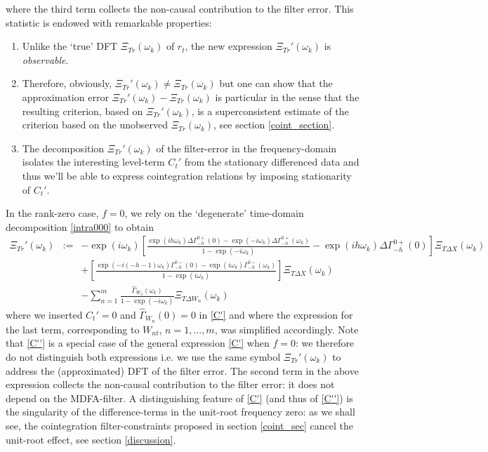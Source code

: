 \documentclass[11pt]{article}
\begin{document}
where the third term collects the non-causal contribution to the filter error. This statistic is endowed with remarkable properties:
\begin{enumerate}
\item Unlike the `true' DFT $\Xi_{Tr}(\omega_k)$ of $r_t$, the new expression $\Xi_{Tr}'(\omega_k)$ is \emph{observable}.
\item  Therefore, obviously, $\Xi_{Tr}'(\omega_k)\not=\Xi_{Tr}(\omega_k)$ but one can show that the approximation error $\Xi_{Tr}'(\omega_k)-\Xi_{Tr}(\omega_k)$ is particular in the sense that the resulting criterion, based on $\Xi_{Tr}'(\omega_k)$, is a superconsistent estimate of the criterion based on the unobserved $\Xi_{Tr}(\omega_k)$, see section \ref{coint_section}. 
\item The decomposition $\Xi_{Tr}'(\omega_k)$ of the filter-error in the frequency-domain isolates the interesting  level-term $C_t'$ from the stationary differenced data and thus we'll be able to express cointegration relations by imposing stationarity of $C_t'$.
\end{enumerate}
In the rank-zero case, $f=0$, we rely on the `degenerate' time-domain decomposition \ref{intra000} to obtain
\begin{eqnarray}
\Xi_{Tr}'(\omega_k)&:=& -\exp(i\omega_k)\left[\frac{\exp(ih\omega_k)\Delta\Gamma_{-h}^{0+}(0)-\exp(-i\omega_k)\Delta\Gamma_{-h}^{0+}(\omega_k)}{1-\exp(-i\omega_k)}-\exp(ih\omega_k)\Delta\Gamma_{-h}^{0+}(0)\right]\Xi_{T\Delta X}(\omega_k)\label{C''}\\
&&+\left[\frac{\exp(-i(-h-1)\omega_k)\Gamma_{-h}^{0-}(0)-\exp(i\omega_k)\Gamma_{-h}^{0-}(\omega_k)}{1-\exp(i\omega_k)}\right]\Xi_{T\Delta X}(\omega_k)\nonumber\\
&&-\sum_{n=1}^m\frac{\hat{\Gamma}_{W_n}(\omega_k)}{1-\exp(-i\omega_k)}\Xi_{T\Delta W_n}(\omega_k)\nonumber
\end{eqnarray} 
where we inserted $C_t'=0$ and $\hat{\Gamma}_{W_n}(0)=0$ in \ref{C'} and where the expression for the last term, corresponding to $W_{nt}$, $n=1,...,m$, was simplified accordingly. Note that \ref{C''} is a special case of the general expression \ref{C'} when $f=0$: we therefore do not distinguish both expressions i.e. we use the same symbol $\Xi_{Tr}'(\omega_k)$ to address the (approximated) DFT of the filter error. The second term in the above expression collects the non-causal contribution to the filter error: it does not depend on the MDFA-filter. A distinguishing feature of \ref{C'} (and thus of \ref{C''}) is the singularity of the difference-terms in the unit-root frequency zero: as we shall see, the cointegration filter-constraints proposed in section \ref{coint_sec} cancel the unit-root effect, see section \ref{discussion}. \\
\end{document}
